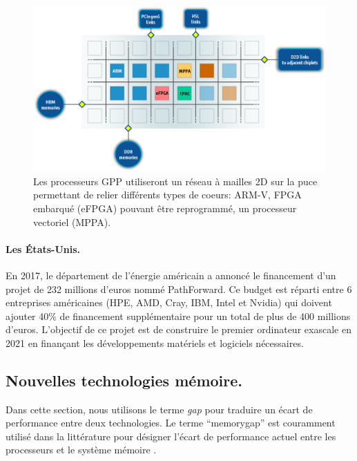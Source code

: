     \begin{figure}
        \center
        \includegraphics[width=14cm]{images/edl_epi_processor.png}
        \caption{\label{fig:edl_epi_processor} Les processeurs GPP utiliseront un réseau à mailles 2D sur la puce permettant de relier différents types de coeurs: ARM-V, FPGA embarqué (eFPGA) pouvant être reprogrammé, un processeur vectoriel (MPPA).}
    \end{figure}
    
    
    \paragraph{Les États-Unis.}
    En 2017, le département de l'énergie américain a annoncé le financement d'un projet de 232 millions d'euros nommé PathForward. Ce budget est réparti entre 6 entreprises américaines (HPE, AMD, Cray, IBM, Intel et Nvidia) qui doivent ajouter 40\% de financement supplémentaire pour un total de plus de 400 millions d'euros. L'objectif de ce projet est de construire le premier ordinateur \gls{exascale} en 2021 en finançant les développements matériels et logiciels nécessaires.


        


\subsection{Nouvelles technologies mémoire.}\label{sec:oppo_new_memory}

     
    Dans cette section, nous utilisons le terme \textit{gap} pour traduire un écart de performance entre deux technologies. Le terme ``\gls{memorygap}'' est couramment utilisé dans la littérature pour désigner l'écart de performance actuel entre les processeurs et le système mémoire \cite{Wilkes2001}.


